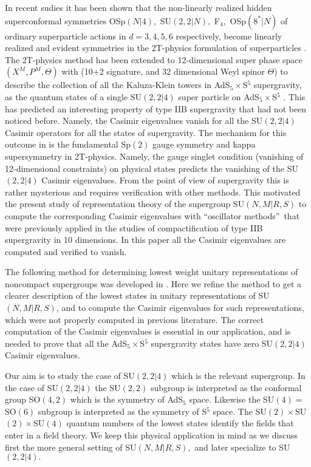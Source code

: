 \documentclass[a4paper,aps,preprint,nofootinbib]{revtex4}
\begin{document}
In recent sudies it has been shown that the non-linearly realized
hidden superconformal symmetries OSp$\left( N|4\right) ,$
SU$\left( 2,2|N\right) ,$ F$_{4},$ OSp$\left( 8^{\ast }|N\right) $
of ordinary superparticle actions in $d=3,4,5,6$ respectively,
become linearly realized and evident symmetries in the 2T-physics
formulation of superparticles \cite{super2t}\cite{survey2T} . The
2T-physics method has been extended to 12-dimensional super phase
space $\left( X^{M},P^{M},\Theta \right) $ with (10+2 signature,
and 32 dimensional Weyl spinor $\Theta $) to describe the
collection of all the Kaluza-Klein towers in AdS$_{5}\times
$S$^{5}$ supergravity, as the quantum states of a single SU$\left(
2,2|4\right) $ super particle on AdS$_{5}\times $S$^{5}$
\cite{survey2T}\cite{AdS5S5}$.$ This has predicted an interesting
property of type IIB supergravity that had not been noticed
before. Namely, the Casimir eigenvalues vanish for all the
SU$\left( 2,2|4\right) $ Casimir operators for all the states of
supergravity. The mechanism for this outcome in \cite{AdS5S5} is
the fundamental Sp$\left( 2\right) $ gauge symmetry and kappa
supersymmetry in 2T-physics. Namely, the gauge singlet condition
(vanishing of 12-dimensional constraints) on physical states
predicts the vanishing of the SU$\left( 2,2|4\right) $ Casimir
eigenvalues. From the point of view of supergravity this is rather
mysterious and requires verification with other methods. This
motivated the present study of representation theory of the
supergroup SU$\left( N,M|R,S\right) $ to compute the corresponding
Casimir eigenvalues with \textquotedblleft oscillator
methods\textquotedblright\ that were previously applied in the
studies of compactification of type IIB supergravity in 10
dimensions. In this paper all the Casimir eigenvalues are computed
and verified to vanish.

The following method for determining lowest weight unitary
representations of noncompact supergroups was developed in
\cite{barsgunaydin}. Here we refine the method to get a clearer
description of the lowest states in unitary representations of
SU$\left( N,M|R,S\right) $, and to compute the Casimir eigenvalues
for such representations, which were not properly computed in
previous literature. The correct computation of the Casimir
eigenvalues is essential in our application, and is needed to
prove that all the AdS$_{5}\times$S$^{5}$ supergravity states have
zero SU$\left( 2,2|4\right) $ Casimir eigenvalues.

Our aim is to study the case of SU$\left( 2,2|4\right) $ which is the
relevant supergroup. In the case of SU$\left( 2,2|4\right) $ the SU$\left(
2,2\right) $ subgroup is interpreted as the conformal group SO$\left(
4,2\right) $ which is the symmetry of AdS$_{5}$ space. Likewise the SU$%
\left( 4\right) =$SO$\left( 6\right) $ subgroup is interpreted as the
symmetry of S$^{5}$ space. The SU$\left( 2\right) \times$SU$\left( 2\right)
\times$SU$\left( 4\right) $ quantum numbers of the lowest states identify
the fields that enter in a field theory. We keep this physical application
in mind as we discuss first the more general setting of SU$\left(
N,M|R,S\right) ,$ and later specialize to SU$\left( 2,2|4\right) .$
\end{document}
